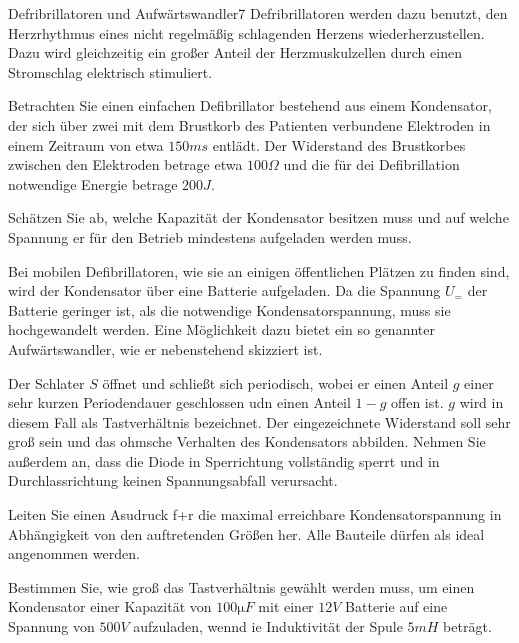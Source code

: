 \begin{problem}{Defribrillatoren und Aufwärtswandler}{7}
 Defribrillatoren werden dazu benutzt, den Herzrhythmus eines nicht regelmäßig schlagenden Herzens wiederherzustellen.  Dazu wird gleichzeitig ein großer Anteil der Herzmuskulzellen durch einen Stromschlag elektrisch stimuliert.

Betrachten Sie einen einfachen Defibrillator bestehend aus einem Kondensator, der sich über zwei mit dem Brustkorb des Patienten verbundene Elektroden in einem Zeitraum von etwa $150\unit{ms}$ entlädt.  Der Widerstand des Brustkorbes zwischen den Elektroden betrage etwa $100\unit{\Omega}$ und die für dei Defibrillation notwendige Energie betrage $200\unit{J}$.

\begin{abcenum}
\item Schätzen Sie ab, welche Kapazität der Kondensator besitzen muss und auf welche Spannung er für den Betrieb mindestens aufgeladen werden muss.
\end{abcenum}

Bei mobilen Defibrillatoren, wie sie an einigen öffentlichen Plätzen zu finden sind, wird der Kondensator über eine Batterie aufgeladen.  Da die Spannung $U_=$ der Batterie geringer ist, als die notwendige Kondensatorspannung, muss sie hochgewandelt werden.  Eine Möglichkeit dazu bietet ein so genannter Aufwärtswandler, wie er nebenstehend skizziert ist.

Der Schlater $S$ öffnet und schließt sich periodisch, wobei er einen Anteil $g$ einer sehr kurzen Periodendauer geschlossen udn einen Anteil $1-g$ offen ist.  $g$ wird in diesem Fall als Tastverhältnis bezeichnet.  Der eingezeichnete Widerstand soll sehr groß sein und das ohmsche Verhalten des Kondensators abbilden.  Nehmen Sie außerdem an, dass die Diode in Sperrichtung vollständig sperrt und in Durchlassrichtung keinen Spannungsabfall verursacht.

\begin{abcenum}
  \item Leiten Sie einen Asudruck f+r die maximal erreichbare Kondensatorspannung in Abhängigkeit von den auftretenden Größen her.  Alle Bauteile dürfen als ideal angenommen werden.
\item Bestimmen Sie, wie groß das Tastverhältnis gewählt werden muss, um einen Kondensator einer Kapazität von $100\unit{\micro F}$ mit einer $12\unit{V}$ Batterie auf eine Spannung von $500\unit{V}$ aufzuladen, wennd ie Induktivität der Spule $5\unit{mH}$ beträgt.
\end{abcenum}

\end{problem}

